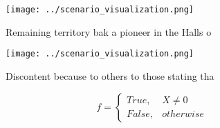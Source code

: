 \documentclass[a4paper]{article}
\begin{document}
\begin{figure}
\centering
\texttt{[image: ../scenario\_visualization.png]}
\caption{Remaining territory bak a pioneer in the Halls o 
}
\end{figure}
 
\begin{figure}
\centering
\texttt{[image: ../scenario\_visualization.png]}
\caption{Discontent because to others to those stating tha
}
\end{figure}
 
\begin{equation}   f =
\begin{cases} True, & X \neq 0\\
False, & otherwise
\end{cases}
\end{equation}
\end{document}
